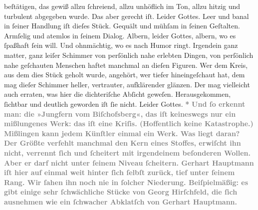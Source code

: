 \begin{ledgroupsized}[t]{13cm}
{{                  beſtätigen, das gewiß allzu ſchreiend, allzu unhöflich im Ton, allzu hitzig und
                  turbulent abgegeben wurde. Das aber gerecht iſt. Leider Gottes. Leer und banal in
                  ſeiner Handlung iſt dieſes Stück. Gequält und mühſam in ſeinen Geſtalten. Armſelig
                  und atemlos in ſeinem Dialog. Albern, leider Gottes, albern, wo es ſpaßhaft ſein
                  will. Und ohnmächtig, wo es nach Humor ringt. Irgendein ganz matter, ganz leiſer
                  Schimmer von perſönlich nahe erlebten Dingen, von perſönlich nahe geſchauten
                  Menschen haftet manchmal an dieſen Figuren. Wer dem Kreis, aus dem dies Stück
                  geholt wurde, angehört, wer tiefer hineingeſchaut hat, dem mag dieſer Schimmer
                  heller, vertrauter, aufklärender glänzen. Der mag vielleicht auch erraten, was
                  hier die dichteriſche Abſicht geweſen. Herausgekommen, ſichtbar und deutlich
                  geworden iſt ſie nicht. Leider Gottes.}}\pend
           \pstart
           \centering{}\textcolor{gray}{\textbf{*}}\pend
           \pstart
           \noindent{}\textcolor{gray}{\textbf{Und ſo erkennt man: die »Jungfern vom Biſchofsberg«, das iſt keineswegs nur ein mißlungenes Werk:
                  das iſt eine Kriſis. (Hoffentlich keine Katastrophe.) Mißlingen kann jedem
                  Künſtler einmal ein Werk. Was liegt daran? Der Größte verfehlt manchmal den Kern
                  eines Stoffes, erwiſcht ihn nicht, verrennt ſich und ſcheitert mit irgendeinem
                  beſonderen Wollen. Aber er darf nicht unter ſeinem Niveau ſcheitern. Gerhart Hauptmann iſt hier auf einmal weit
                  hinter ſich ſelbſt zurück, tief unter ſeinem Rang. Wir ſahen ihn noch nie in
                  ſolcher Niederung. Beiſpielmäßig: es gibt einige sehr ſchwächliche Stücke von Georg Hirſchfeld, die ſich ausnehmen wie ein
                  ſchwacher Abklatſch von Gerhart Hauptmann.
}}
\end{ledgroupsized}
